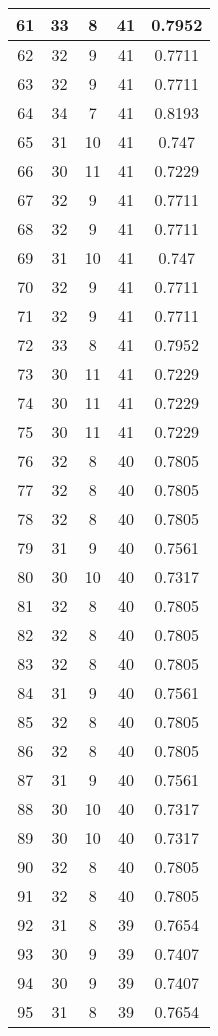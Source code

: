 \documentclass[letterpaper, 12pt]{article}
\begin{document}
\begin{longtable}{|c|c|c|c|c|}
\hline
61 & 33 & 8 & 41 & 0.7952 \\
\hline
62 & 32 & 9 & 41 & 0.7711 \\
\hline
63 & 32 & 9 & 41 & 0.7711 \\
\hline
64 & 34 & 7 & 41 & 0.8193 \\
\hline
65 & 31 & 10 & 41 & 0.747 \\
\hline
66 & 30 & 11 & 41 & 0.7229 \\
\hline
67 & 32 & 9 & 41 & 0.7711 \\
\hline
68 & 32 & 9 & 41 & 0.7711 \\
\hline
69 & 31 & 10 & 41 & 0.747 \\
\hline
70 & 32 & 9 & 41 & 0.7711 \\
\hline
71 & 32 & 9 & 41 & 0.7711 \\
\hline
72 & 33 & 8 & 41 & 0.7952 \\
\hline
73 & 30 & 11 & 41 & 0.7229 \\
\hline
74 & 30 & 11 & 41 & 0.7229 \\
\hline
75 & 30 & 11 & 41 & 0.7229 \\
\hline
76 & 32 & 8 & 40 & 0.7805 \\
\hline
77 & 32 & 8 & 40 & 0.7805 \\
\hline
78 & 32 & 8 & 40 & 0.7805 \\
\hline
79 & 31 & 9 & 40 & 0.7561 \\
\hline
80 & 30 & 10 & 40 & 0.7317 \\
\hline
81 & 32 & 8 & 40 & 0.7805 \\
\hline
82 & 32 & 8 & 40 & 0.7805 \\
\hline
83 & 32 & 8 & 40 & 0.7805 \\
\hline
84 & 31 & 9 & 40 & 0.7561 \\
\hline
85 & 32 & 8 & 40 & 0.7805 \\
\hline
86 & 32 & 8 & 40 & 0.7805 \\
\hline
87 & 31 & 9 & 40 & 0.7561 \\
\hline
88 & 30 & 10 & 40 & 0.7317 \\
\hline
89 & 30 & 10 & 40 & 0.7317 \\
\hline
90 & 32 & 8 & 40 & 0.7805 \\
\hline
91 & 32 & 8 & 40 & 0.7805 \\
\hline
92 & 31 & 8 & 39 & 0.7654 \\
\hline
93 & 30 & 9 & 39 & 0.7407 \\
\hline
94 & 30 & 9 & 39 & 0.7407 \\
\hline
95 & 31 & 8 & 39 & 0.7654 \\

\end{longtable}
\end{document}
